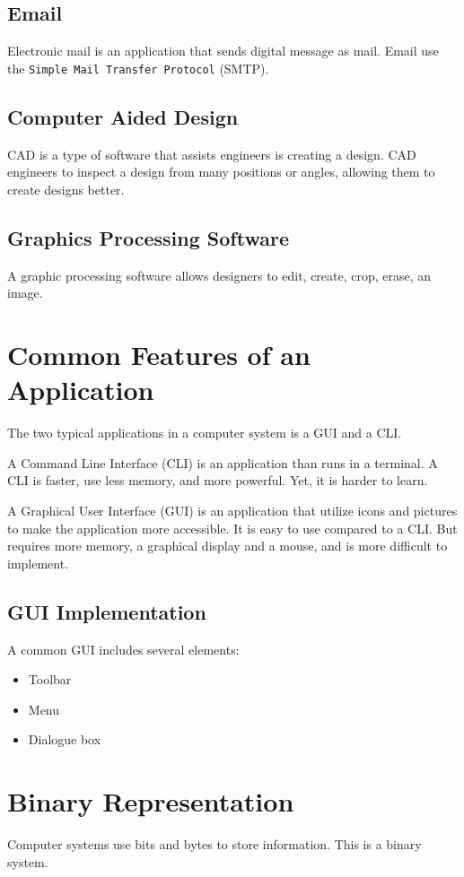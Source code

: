 \documentclass[../notes.tex]{subfiles}
\begin{document}
\subsection{Email}
Electronic mail is an application that sends digital message as mail.
Email use the \texttt{Simple Mail Transfer Protocol} (SMTP). 

\subsection{Computer Aided Design}
CAD is a type of software that assists engineers is creating a design.
CAD engineers to inspect a design from many positions or angles, allowing them to create designs better.

\subsection{Graphics Processing Software}
A graphic processing software allows designers to edit, create, crop, erase, an image.

\section{Common Features of an Application}
The two typical applications in a computer system is a GUI and a CLI.

A Command Line Interface (CLI) is an application than runs in a terminal.
A CLI is faster, use less memory, and more powerful.
Yet, it is harder to learn.

A Graphical User Interface (GUI) is an application that utilize icons and pictures to make the application more accessible.
It is easy to use compared to a CLI. 
But requires more memory, a graphical display and a mouse, and is more difficult to implement.

\subsection{GUI Implementation}
A common GUI includes several elements: 
\begin{itemize}
	\item Toolbar
	\item Menu
	\item Dialogue box
\end{itemize}

\section{Binary Representation}
Computer systems use bits and bytes to store information.
This is a binary system.
\end{document}
